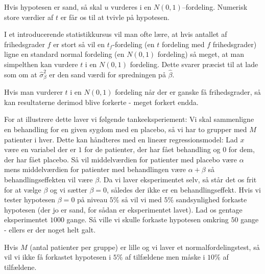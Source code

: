 \documentclass[]{article}
\begin{document}
Hvis hypotesen er sand, så skal \(u\) vurderes i en
\(N(0,1)\)--fordeling. Numerisk store værdier af \(t\) er får os til at
tvivle på hypotesen.

I et introducerende statistikkursus vil man ofte lære, at hvis antallet
af frihedsgrader \(f\) er stort så vil en \(t_f\)-fordeling (en \(t\)
fordeling med \(f\) frihedsgrader) ligne en standard normal fordeling
(en \(N(0,1)\) fordeling) så meget, at man simpelthen kan vurdere \(t\)
i en \(N(0,1)\) fordeling. Dette svarer præcist til at lade som om at
\(\hat\sigma^2_\beta\) er den sand værdi for spredningen på
\(\hat\beta\).

Hvis man vurderer \(t\) i en \(N(0,1)\) fordeling når der er ganske få
frihedsgrader, så kan resultaterne derimod blive forkerte - meget
forkert endda.

For at illustrere dette laver vi følgende tankeeksperiement: Vi skal
sammenligne en behandling for en given sygdom med en placebo, så vi har
to grupper med \(M\) patienter i hver. Dette kan håndteres med en lineær
regressionsmodel: Lad \(x\) være en variabel der er \(1\) for de
patienter, der har fået behandling og \(0\) for dem, der har fået
placebo. Så vil middelværdien for patienter med placebo være \(\alpha\)
mens middelværdien for patienter med behandlingen være \(\alpha+\beta\)
så behandlingseffekten vil være \(\beta\). Da vi laver eksperimentet
selv, så står det os frit for at vælge \(\beta\) og vi sætter
\(\beta=0\), således der ikke er en behandlingseffekt. Hvis vi tester
hypotesen \(\beta=0\) på niveau \(5\%\) så vil vi med \(5\%\)
sandsynlighed forkaste hypotesen (der jo er sand, for sådan er
eksperimentet lavet). Lad os gentage eksperimentet \(1000\) gange. Så
ville vi skulle forkaste hypotesen omkring \(50\) gange - ellers er der
noget helt galt.

Hvis \(M\) (antal patienter per gruppe) er lille og vi laver et
normalfordelingstest, så vil vi ikke få forkastet hypotesen i \(5\%\) af
tilfældene men måske i \(10\%\) af tilfældene.

\scriptsize
\end{document}
